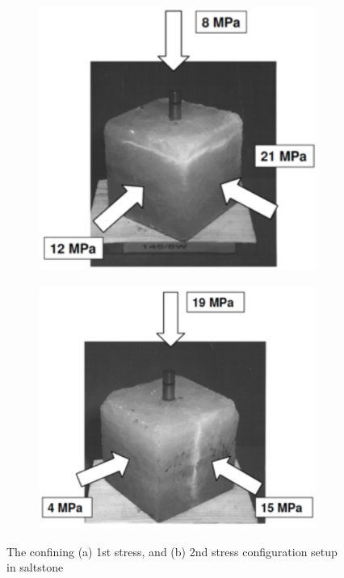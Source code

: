 \begin{figure}[!ht]
\begin{subfigure}[c]{0.48\textwidth}
\includegraphics[width=1\textwidth]{figures/Amir_ME2_stress_state_1.png}
\subcaption{}
\label{fig:Amir_ME2_stress_state_a}
\end{subfigure}
\hfill
\begin{subfigure}[c]{0.48\textwidth}
\includegraphics[width=1\textwidth]{figures/Amir_ME2_stress_state_2.png}
\subcaption{}
\label{fig:Amir_ME2_stress_state_b}
\end{subfigure}
\caption{The confining (a) 1st stress, and (b) 2nd stress configuration setup in saltstone \cite{Kamlot2009}}
\end{figure}

